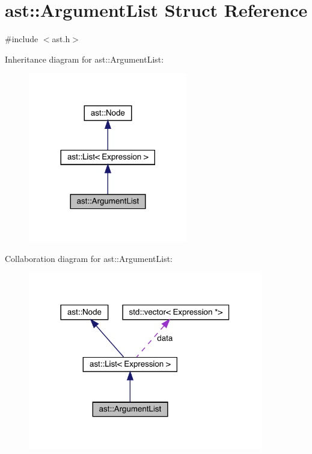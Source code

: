 \hypertarget{structast_1_1_argument_list}{}\section{ast\+:\+:Argument\+List Struct Reference}
\label{structast_1_1_argument_list}


{\ttfamily \#include $<$ast.\+h$>$}



Inheritance diagram for ast\+:\+:Argument\+List\+:
\nopagebreak
\begin{figure}[H]
\begin{center}
\leavevmode
\includegraphics[width=197pt]{structast_1_1_argument_list__inherit__graph}
\end{center}
\end{figure}


Collaboration diagram for ast\+:\+:Argument\+List\+:
\nopagebreak
\begin{figure}[H]
\begin{center}
\leavevmode
\includegraphics[width=290pt]{structast_1_1_argument_list__coll__graph}
\end{center}
\end{figure}
